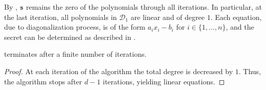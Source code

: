 By , $\mathbf{s}$ remains the zero of the polynomials through all iterations.
In particular, at the last iteration, all polynomials in $\mathcal{D}_1$ are linear and of degree $1$.
Each equation, due to diagonalization process, is of the form $a_i x_i -b_i$ for $i \in \{1,\dots,n\}$, and the secret can be determined as described in .



\begin{proposition}[Termination]\label{prop:termination}
 terminates after a finite number of iterations.
\end{proposition}

\begin{proof}
  At each iteration of the algorithm the total degree is decreased by $1$. Thus, the algorithm stops after $d-1$ iterations, yielding linear equations. 
\end{proof}






